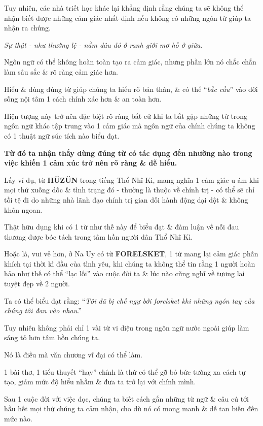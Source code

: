 \documentclass{article}
\begin{document}
Tuy nhiên, các nhà triết học khác lại khẳng định rằng chúng ta sẽ không thể nhận biết được những cảm giác nhất định nếu không có những ngôn từ giúp ta nhận ra chúng.

%
\textit{Sự thật - như thường lệ - nằm đâu đó ở ranh giới mơ hồ ở giữa}.

Ngôn ngữ có thể không hoàn toàn tạo ra cảm giác, nhưng phần lớn nó chắc chắn làm sâu sắc \& rõ ràng cảm giác hơn.

Hiểu \& dùng đúng từ giúp chúng ta hiểu rõ bản thân, \& có thể ``\textit{bắc cầu}'' vào đời sống nội tâm 1 cách chính xác hơn \& an toàn hơn.

%
Hiện tượng này trở nên đặc biệt rõ ràng bất cứ khi ta bắt gặp những từ trong ngôn ngữ khác tập trung vào 1 cảm giác mà ngôn ngữ của chính chúng ta không có 1 thuật ngữ súc tích nào biểu đạt.

\textbf{Từ đó ta nhận thấy dùng đúng từ có tác dụng đến nhường nào trong việc khiến 1 cảm xúc trở nên rõ ràng \& dễ hiểu.}

%
Lấy ví dụ, từ \textbf{HÜZÜN} trong tiếng Thổ Nhĩ Kì, mang nghĩa 1 cảm giác u ám khi mọi thứ xuống dốc \& tình trạng đó - thường là thuộc về chính trị - có thể sẽ chỉ tồi tệ đi do những nhà lãnh đạo chính trị gian dối hành động dại dột \& không khôn ngoan.

Thật hữu dụng khi có 1 từ như thế này để biểu đạt \& đàm luận về nỗi đau thương được bóc tách trong tâm hồn người dân Thổ Nhĩ Kì.

%
Hoặc là, vui vẻ hơn, ở Na Uy có từ \textbf{FORELSKET}, 1 từ mang lại cảm giác phấn khích tại thời kì đầu của tình yêu, khi chúng ta không thể tin rằng 1 người hoàn hảo như thế có thể ``lạc lối'' vào cuộc đời ta \& lúc nào cũng nghĩ về tương lai tuyệt đẹp về 2 người.

Ta có thể biểu đạt rằng: ``\textit{Tôi đã bị chế ngự bởi forelsket khi những ngón tay của chúng tôi đan vào nhau}.''

%
Tuy nhiên không phải chỉ 1 vài từ vi diệu trong ngôn ngữ nước ngoài giúp làm sáng tỏ hơn tâm hồn chúng ta.

Nó là điều mà văn chương vĩ đại có thể làm.

1 bài thơ, 1 tiểu thuyết ``hay'' chính là thứ có thể gỡ bỏ bức tường xa cách tự tạo, giảm mức độ hiểu nhầm \& đưa ta trở lại với chính mình.

Sau 1 cuộc đời với việc đọc, chúng ta biết cách gắn những từ ngữ \& câu cú tới hầu hết mọi thứ chúng ta cảm nhận, cho dù nó có mong manh \& dễ tan biến đến mức nào.
\end{document}
